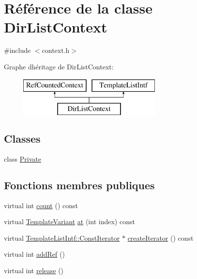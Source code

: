 \hypertarget{class_dir_list_context}{}\section{Référence de la classe Dir\+List\+Context}
\label{class_dir_list_context}


{\ttfamily \#include $<$context.\+h$>$}

Graphe d\textquotesingle{}héritage de Dir\+List\+Context\+:\begin{figure}[H]
\begin{center}
\leavevmode
\includegraphics[height=2.000000cm]{class_dir_list_context}
\end{center}
\end{figure}
\subsection*{Classes}
\begin{DoxyCompactItemize}
\item 
class \hyperlink{class_dir_list_context_1_1_private}{Private}
\end{DoxyCompactItemize}
\subsection*{Fonctions membres publiques}
\begin{DoxyCompactItemize}
\item 
virtual int \hyperlink{class_dir_list_context_a78134d9b72fa926ca75ccb3637254667}{count} () const 
\item 
virtual \hyperlink{class_template_variant}{Template\+Variant} \hyperlink{class_dir_list_context_af27343110541424520b96bf1148adf46}{at} (int index) const 
\item 
virtual \hyperlink{class_template_list_intf_1_1_const_iterator}{Template\+List\+Intf\+::\+Const\+Iterator} $\ast$ \hyperlink{class_dir_list_context_a2cf1a94e16284e368ef8013764543247}{create\+Iterator} () const 
\item 
virtual int \hyperlink{class_dir_list_context_abdf1dfce3d1e7693c50080226603e121}{add\+Ref} ()
\item 
virtual int \hyperlink{class_dir_list_context_a138217a1757cf808ffa7eeb9fb051855}{release} ()
\end{DoxyCompactItemize}
